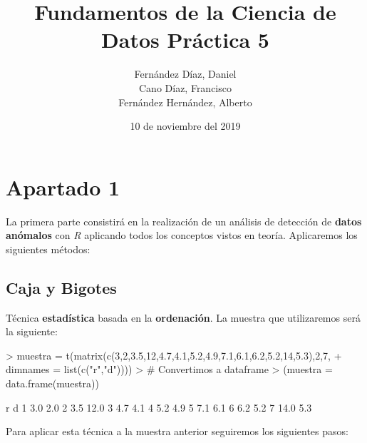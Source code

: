 \documentclass [a4paper] {article}
\title{\textbf{Fundamentos de la Ciencia de Datos Práctica 5}}
\author{
	Fernández Díaz, Daniel\\
	Cano Díaz, Francisco\\
	Fernández Hernández, Alberto\\
}
\date{10 de noviembre del 2019}
\begin{document}

\maketitle
\newpage
\tableofcontents
\newpage
\section{Apartado 1}
La primera parte consistirá en la realización de un análisis de detección de \textbf{datos anómalos}
con \textit{R} aplicando todos los conceptos vistos en teoría. Aplicaremos los siguientes
métodos:
\subsection{Caja y Bigotes}
Técnica \textbf{estadística} basada en la \textbf{ordenación}. La muestra que utilizaremos será la siguiente:
\begin{Schunk}
\begin{Sinput}
> muestra = t(matrix(c(3,2,3.5,12,4.7,4.1,5.2,4.9,7.1,6.1,6.2,5.2,14,5.3),2,7,
+ dimnames = list(c("r","d"))))
> # Convertimos a dataframe
> (muestra = data.frame(muestra))
\end{Sinput}
\begin{Soutput}
     r    d
1  3.0  2.0
2  3.5 12.0
3  4.7  4.1
4  5.2  4.9
5  7.1  6.1
6  6.2  5.2
7 14.0  5.3
\end{Soutput}
\end{Schunk}
Para aplicar esta técnica a la muestra anterior seguiremos los siguientes pasos:
\end{document}
